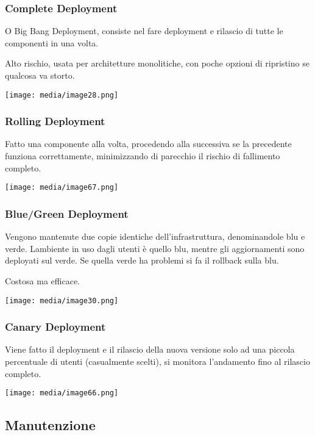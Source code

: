 \subsubsection{Complete Deployment}\label{complete-deployment}

O Big Bang Deployment, consiste nel fare deployment e rilascio di tutte
le componenti in una volta.

Alto rischio, usata per architetture monolitiche, con poche opzioni di
ripristino se qualcosa va storto.

\texttt{[image: media/image28.png]}

\subsubsection{Rolling Deployment}\label{rolling-deployment}

Fatto una componente alla volta, procedendo alla successiva se la
precedente funziona correttamente, minimizzando di parecchio il rischio
di fallimento completo.

\texttt{[image: media/image67.png]}

\subsubsection{Blue/Green Deployment}\label{bluegreen-deployment}

Vengono mantenute due copie identiche dell'infrastruttura, denominandole
blu e verde. L\textquotesingle ambiente in uso dagli utenti è quello
blu, mentre gli aggiornamenti sono deployati sul verde. Se quella verde
ha problemi si fa il rollback sulla blu.

Costosa ma efficace.

\texttt{[image: media/image30.png]}

\subsubsection{Canary Deployment}\label{canary-deployment}

Viene fatto il deployment e il rilascio della nuova versione solo ad una
piccola percentuale di utenti (casualmente scelti), si monitora
l'andamento fino al rilascio completo.

\texttt{[image: media/image66.png]}

\subsection{Manutenzione}\label{manutenzione}

